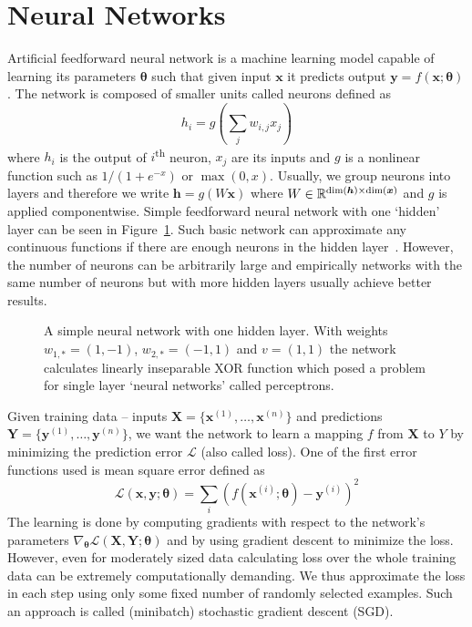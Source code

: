 \section{Neural Networks}
Artificial feedforward neural network is a machine learning model capable of learning its parameters $\bm{\theta}$ such that given input $\bm{x}$ it predicts output $\bm{y}=f(\bm{x};\bm{\theta})$. The network is composed of smaller units called neurons defined as
\begin{equation*}
h_i=g\left(\sum_{j}w_{i,j}x_j\right)
\end{equation*}
where $h_i$ is the output of $i$\textsuperscript{th} neuron, $x_j$ are its inputs and $g$ is a nonlinear function such as $1/(1+e^{-x})$ or $\max(0, x)$. Usually, we group neurons into layers and therefore we write $\bm{h}=g(W\bm{x})$ where $W\in\mathbb{R}^{\dim(\bm{h})\times\dim(\bm{x})}$ and $g$ is applied componentwise. Simple feedforward neural network with one `hidden' layer can be seen in Figure~\ref{fig:basic_nn}. Such basic network can approximate any continuous functions if there are enough neurons in the hidden layer~\cite{HORNIK}. However, the number of neurons can be arbitrarily large and empirically networks with the same number of neurons but with more hidden layers usually achieve better results.

\begin{figure}
	\centering
	
	
	\caption[A simple neural network]{A simple neural network with one hidden layer. With weights $w_{1,*} = (1,-1)$, $w_{2,*} = (-1,1)$ and  $v = (1,1)$ the network calculates linearly inseparable \textsf{XOR} function which posed a problem for single layer `neural networks' called perceptrons.}
	\label{fig:basic_nn}
\end{figure}

Given training data -- inputs $\bm{X}=\{\bm{x}^{(1)},\dots,\bm{x}^{(n)}\}$ and predictions $\bm{Y}=\{\bm{y}^{(1)},\dots,\bm{y}^{(n)}\}$, we want the network to learn a mapping $f$ from $\bm{X}$ to $Y$ by minimizing the prediction error $\mathcal{L}$ (also called loss). One of the first error functions used is mean square error defined as
\begin{equation*}
\mathcal{L}(\bm{x},\bm{y};\bm{\theta})=\sum_i\left(f(\bm{x}^{(i)};\bm{\theta})-\bm{y}^{(i)}\right)^2
\end{equation*}
The learning is done by computing gradients with respect to the network's parameters $\nabla_{\bm{\theta}}\mathcal{L}(\bm{X},\bm{Y};\bm{\theta})$ and by using gradient descent to minimize the loss. However, even for moderately sized data calculating loss over the whole training data can be extremely computationally demanding. We thus approximate the loss in each step using only some fixed number of randomly selected examples. Such an approach is called (minibatch) stochastic gradient descent (SGD).


